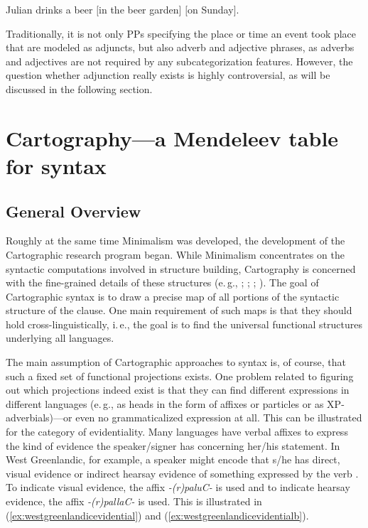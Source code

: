 \begin{exe}
\ex\label{simpleargumentsoftheverbbb} Julian drinks a beer $[$in the beer garden$]$ $[$on Sunday$]$.
\end{exe}

\noindent Traditionally, it is not only PPs specifying the place or time an event took place that are modeled as adjuncts, but also adverb and adjective phrases, as adverbs and adjectives are not required by any subcategorization features.  However, the question whether adjunction really exists is highly controversial, as will be discussed in the following section.
\label{generaladjunctionb}


\section{Cartography---a Mendeleev table for syntax}\label{cartographicenterprise}\label{theoryintrob}
\subsection{General Overview}
Roughly at the same time Minimalism was developed, the development of the Cartographic research program began. While Minimalism concentrates on the syntactic computations involved in structure building, Cartography is concerned with the fine-grained details of these structures (e.\,g., \citealt{cinque1999adverbs}; \citealt{rizzi2004cartography}; \citealt{belletti2008structures}; \citealt{cinque2008cartography}). The goal of Cartographic syntax is to draw a precise map of all portions of the syntactic structure of the clause. One main requirement of such maps is that they should hold cross-linguistically, i.\,e., the goal is to find the universal functional structures underlying all languages. 

The main assumption of Cartographic approaches to syntax is, of course, that such a fixed set of functional projections exists. One problem related to figuring out which projections indeed exist is that they can find different expressions in different languages (e.\,g., as heads in the form of affixes or particles or as XP-adverbials)---or even no grammaticalized expression at all. This can be illustrated for the category of evidentiality. Many languages have verbal affixes to express the kind of evidence the speaker/signer has concerning her/his statement. In West Greenlandic, for example, a speaker might encode that s/he has direct, visual evidence or indirect hearsay evidence of something expressed by the verb \citep{fortescue2003evidentiality}. To indicate visual evidence, the affix \textit{-(r)paluC-} is used and to indicate hearsay evidence, the affix \textit{-(r)pallaC-} is used. This is illustrated in (\ref{ex:westgreenlandicevidential}) and (\ref{ex:westgreenlandicevidentialb}).


